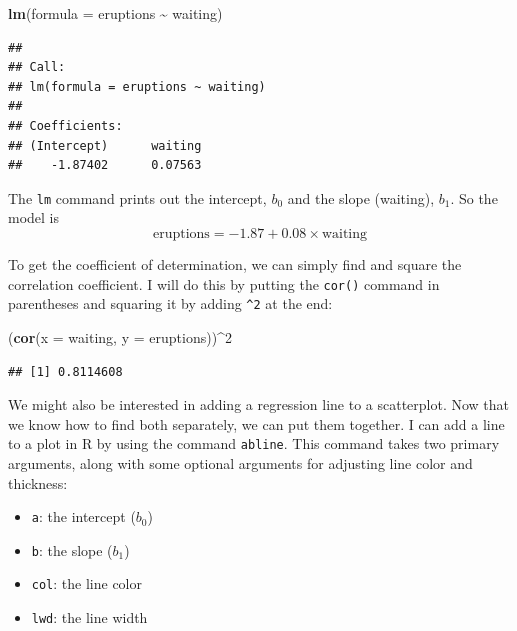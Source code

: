 \documentclass[
]{book}
\newenvironment{Shaded}{\begin{snugshade}}{\end{snugshade}}
\newcommand{\AttributeTok}[1]{\textcolor[rgb]{0.13,0.29,0.53}{#1}}
\newcommand{\DecValTok}[1]{\textcolor[rgb]{0.00,0.00,0.81}{#1}}
\newcommand{\FunctionTok}[1]{\textcolor[rgb]{0.13,0.29,0.53}{\textbf{#1}}}
\newcommand{\NormalTok}[1]{#1}
\newcommand{\SpecialCharTok}[1]{\textcolor[rgb]{0.81,0.36,0.00}{\textbf{#1}}}
\providecommand{\tightlist}{%
  \setlength{\itemsep}{0pt}\setlength{\parskip}{0pt}}
\begin{document}
\begin{Shaded}
\begin{Highlighting}[]
\FunctionTok{lm}\NormalTok{(}\AttributeTok{formula =}\NormalTok{ eruptions }\SpecialCharTok{\textasciitilde{}}\NormalTok{ waiting)}
\end{Highlighting}
\end{Shaded}

\begin{verbatim}
## 
## Call:
## lm(formula = eruptions ~ waiting)
## 
## Coefficients:
## (Intercept)      waiting  
##    -1.87402      0.07563
\end{verbatim}

The \texttt{lm} command prints out the intercept, \(b_0\) and the slope
(waiting), \(b_1\). So the model is
\[\text{eruptions} = -1.87 + 0.08\times\text{waiting}\]

To get the coefficient of determination, we can simply find and square
the correlation coefficient. I will do this by putting the \texttt{cor()}
command in parentheses and squaring it by adding \texttt{\^{}2} at the end:

\begin{Shaded}
\begin{Highlighting}[]
\NormalTok{(}\FunctionTok{cor}\NormalTok{(}\AttributeTok{x =}\NormalTok{ waiting, }\AttributeTok{y =}\NormalTok{ eruptions))}\SpecialCharTok{\^{}}\DecValTok{2}
\end{Highlighting}
\end{Shaded}

\begin{verbatim}
## [1] 0.8114608
\end{verbatim}

We might also be interested in adding a regression line to a
scatterplot. Now that we know how to find both separately, we can put
them together. I can add a line to a plot in R by using the command
\texttt{abline}. This command takes two primary arguments, along with some
optional arguments for adjusting line color and thickness:

\begin{itemize}
\tightlist
\item
  \texttt{a}: the intercept (\(b_0\))
\item
  \texttt{b}: the slope (\(b_1\))
\item
  \texttt{col}: the line color
\item
  \texttt{lwd}: the line width
\end{itemize}
\end{document}
